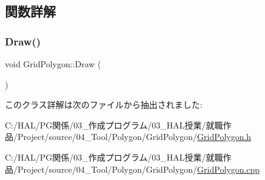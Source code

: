 \subsection{関数詳解}
\mbox{\label{class_grid_polygon_a93a672fb9d5b6757c132fba8792f5459}} 
\subsubsection{\texorpdfstring{Draw()}{Draw()}}
{\footnotesize\ttfamily void Grid\+Polygon\+::\+Draw (\begin{DoxyParamCaption}{ }\end{DoxyParamCaption})}



このクラス詳解は次のファイルから抽出されました\+:\begin{DoxyCompactItemize}
\item 
C\+:/\+H\+A\+L/\+P\+G関係/03\+\_\+作成プログラム/03\+\_\+\+H\+A\+L授業/就職作品/\+Project/source/04\+\_\+\+Tool/\+Polygon/\+Grid\+Polygon/\mbox{\hyperlink{_grid_polygon_8h}{Grid\+Polygon.\+h}}\item 
C\+:/\+H\+A\+L/\+P\+G関係/03\+\_\+作成プログラム/03\+\_\+\+H\+A\+L授業/就職作品/\+Project/source/04\+\_\+\+Tool/\+Polygon/\+Grid\+Polygon/\mbox{\hyperlink{_grid_polygon_8cpp}{Grid\+Polygon.\+cpp}}\end{DoxyCompactItemize}
